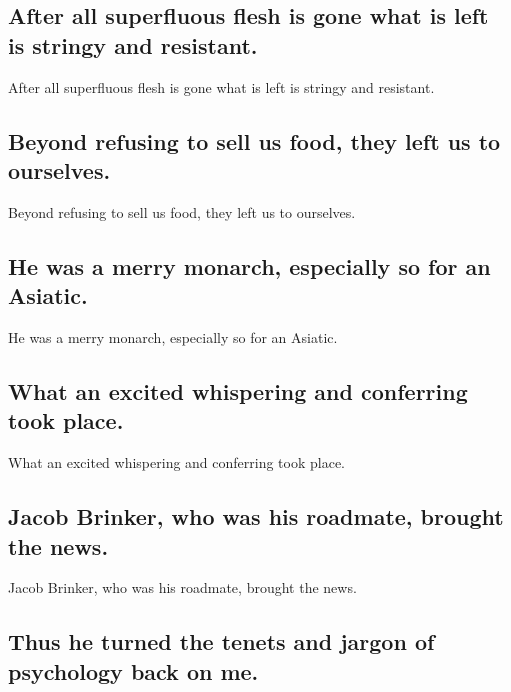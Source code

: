 \documentclass[]{article}
\begin{document}
\hypertarget{after-all-superfluous-flesh-is-gone-what-is-left-is-stringy-and-resistant.}{%
\subsection{After all superfluous flesh is gone what is left is stringy
and
resistant.}\label{after-all-superfluous-flesh-is-gone-what-is-left-is-stringy-and-resistant.}}

After all superfluous flesh is gone what is left is stringy and
resistant.

\hypertarget{beyond-refusing-to-sell-us-food-they-left-us-to-ourselves.}{%
\subsection{Beyond refusing to sell us food, they left us to
ourselves.}\label{beyond-refusing-to-sell-us-food-they-left-us-to-ourselves.}}

Beyond refusing to sell us food, they left us to ourselves.

\hypertarget{he-was-a-merry-monarch-especially-so-for-an-asiatic.}{%
\subsection{He was a merry monarch, especially so for an
Asiatic.}\label{he-was-a-merry-monarch-especially-so-for-an-asiatic.}}

He was a merry monarch, especially so for an Asiatic.

\hypertarget{what-an-excited-whispering-and-conferring-took-place.}{%
\subsection{What an excited whispering and conferring took
place.}\label{what-an-excited-whispering-and-conferring-took-place.}}

What an excited whispering and conferring took place.

\hypertarget{jacob-brinker-who-was-his-roadmate-brought-the-news.}{%
\subsection{Jacob Brinker, who was his roadmate, brought the
news.}\label{jacob-brinker-who-was-his-roadmate-brought-the-news.}}

Jacob Brinker, who was his roadmate, brought the news.

\hypertarget{thus-he-turned-the-tenets-and-jargon-of-psychology-back-on-me.}{%
\subsection{Thus he turned the tenets and jargon of psychology back on
me.}\label{thus-he-turned-the-tenets-and-jargon-of-psychology-back-on-me.}}
\end{document}
